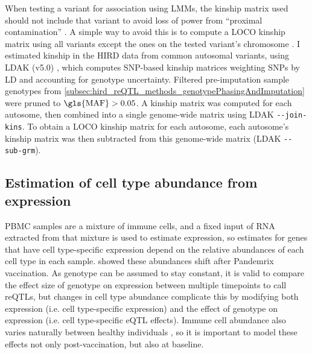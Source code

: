 %
When testing a variant for association using \glspl{LMM}, the kinship matrix used should not include that variant to avoid loss of power from \enquote{proximal contamination} \autocite{listgarten2012ImprovedLinearMixed}.
A simple way to avoid this is to compute a \gls{LOCO} kinship matrix using all variants except the ones on the tested variant's chromosome \autocite{lippert2011FaSTLinearMixed}.
I estimated kinship in the \gls{HIRD} data from common autosomal variants, using {LDAK} (v5.0) \autocite{speed2012ImprovedHeritabilityEstimation}, which computes \gls{SNP}-based kinship matrices weighting \glspl{SNP} by \gls{LD} and accounting for genotype uncertainty.
Filtered pre-imputation sample genotypes from \cref{subsec:hird_reQTL_methods_genotypePhasingAndImputation} were pruned to $\text{\gls{MAF}} > 0.05$.
A kinship matrix was computed for each autosome, then combined into a single genome-wide matrix using LDAK \texttt{-{}-join-kins}.
To obtain a \gls{LOCO} kinship matrix for each autosome, each autosome's kinship matrix was then subtracted from this genome-wide matrix (LDAK \texttt{-{}-sub-grm}).

\subsection{Estimation of cell type abundance from expression}
\label{subsec:hird_reQTL_xCell}

%
\Gls{PBMC} samples are a mixture of immune cells, and a fixed input of RNA extracted from that mixture is used to estimate expression, 
so estimates for genes that have cell type-specific expression depend on the relative abundances of each cell type in each sample.
\textcite{sobolev2016AdjuvantedInfluenzaH1N1Vaccination} showed these abundances shift after Pandemrix vaccination.
As genotype can be assumed to stay constant, it is valid to compare the effect size of genotype on expression between multiple timepoints to call \glspl{reQTL}, 
but changes in cell type abundance complicate this by modifying both expression (i.e. cell type-specific expression)
and the effect of genotype on expression (i.e. cell type-specific \gls{eQTL} effects).
Immune cell abundance also varies naturally between healthy individuals \autocite{brodin2015VariationHumanImmune,brodin2017HumanImmuneSystem}, so it is important to model these effects not only post-vaccination, but also at baseline.

